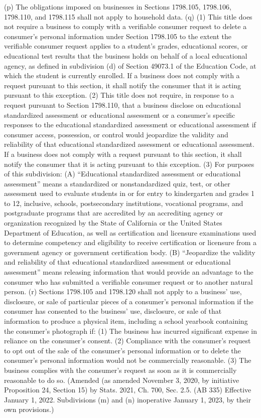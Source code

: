 (p) The obligations imposed on businesses in Sections 1798.105, 1798.106, 1798.110, and 1798.115 shall not apply to household data.
(q) (1) This title does not require a business to comply with a verifiable consumer request to delete a consumer’s personal information under Section 1798.105 to the extent the verifiable consumer request applies to a student’s grades, educational scores, or educational test results that the business holds on behalf of a local educational agency, as defined in subdivision (d) of Section 49073.1 of the Education Code, at which the student is currently enrolled. If a business does not comply with a request pursuant to this section, it shall notify the consumer that it is acting pursuant to this exception.
(2) This title does not require, in response to a request pursuant to Section 1798.110, that a business disclose on educational standardized assessment or educational assessment or a consumer’s specific responses to the educational standardized assessment or educational assessment if consumer access, possession, or control would jeopardize the validity and reliability of that educational standardized assessment or educational assessment. If a business does not comply with a request pursuant to this section, it shall notify the consumer that it is acting pursuant to this exception.
(3) For purposes of this subdivision:
(A) “Educational standardized assessment or educational assessment” means a standardized or nonstandardized quiz, test, or other assessment used to evaluate students in or for entry to kindergarten and grades 1 to 12, inclusive, schools, postsecondary institutions, vocational programs, and postgraduate programs that are accredited by an accrediting agency or organization recognized by the State of California or the United States Department of Education, as well as certification and licensure examinations used to determine competency and eligibility to receive certification or licensure from a government agency or government certification body.
(B) “Jeopardize the validity and reliability of that educational standardized assessment or educational assessment” means releasing information that would provide an advantage to the consumer who has submitted a verifiable consumer request or to another natural person.
(r) Sections 1798.105 and 1798.120 shall not apply to a business’ use, disclosure, or sale of particular pieces of a consumer’s personal information if the consumer has consented to the business’ use, disclosure, or sale of that information to produce a physical item, including a school yearbook containing the consumer’s photograph if:
(1) The business has incurred significant expense in reliance on the consumer’s consent.
(2) Compliance with the consumer’s request to opt out of the sale of the consumer’s personal information or to delete the consumer’s personal information would not be commercially reasonable.
(3) The business complies with the consumer’s request as soon as it is commercially reasonable to do so.
(Amended (as amended November 3, 2020, by initiative Proposition 24, Section 15) by Stats. 2021, Ch. 700, Sec. 2.5. (AB 335) Effective January 1, 2022. Subdivisions (m) and (n) inoperative January 1, 2023, by their own provisions.)

